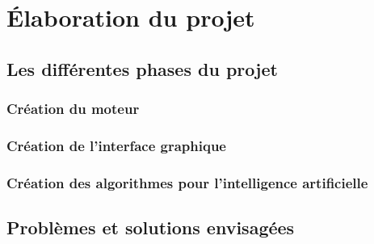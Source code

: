 \section{Élaboration du projet}
\subsection{Les différentes phases du projet}
	\subsubsection{Création du moteur}
	\subsubsection{Création de l'interface graphique}
	\subsubsection{Création des algorithmes pour l'intelligence artificielle}
\subsection{Problèmes et solutions envisagées}